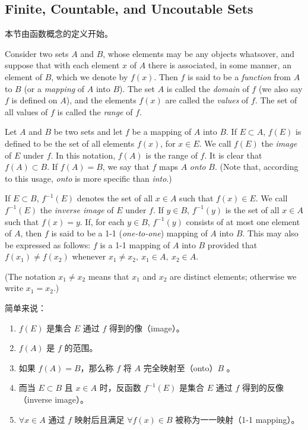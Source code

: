 \documentclass[../poma-notes.tex]{subfiles}
\begin{document}
\subsection*{Finite, Countable, and Uncoutable Sets}

本节由函数概念的定义开始。

\begin{definition}
  Consider two sets $A$ and $B$, whose elements may be any objects whatsover, and suppose that with each
  element $x$ of $A$ there is associated, in some manner, an element of $B$, which we denote by $f(x)$.
  Then $f$ is said to be a \textit{function} from $A$ to $B$ (or a \textit{mapping} of $A$ into $B$).
  The set $A$ is called the \textit{domain} of $f$ (we also say $f$ is defined on $A$), and the elements $f(x)$
  are called the \textit{values} of $f$. The set of all values of $f$ is called the \textit{range} of $f$.
\end{definition}

\begin{definition}
  Let $A$ and $B$ be two sets and let $f$ be a mapping of $A$ into $B$. If $E \subset A$, $f(E)$ is defined to
  be the set of all elements $f(x)$, for $x \in E$. We call $f(E)$ the \textit{image} of $E$ under $f$.
  In this notation, $f(A)$ is the range of $f$. It is clear that $f(A) \subset B$. If $f(A)=B$, we say that $f$
  maps $A$ \textit{onto} $B$. (Note that, according to this usage, \textit{onto} is more specific than \textit{into}.)

  If $E \subset B$, $f^{-1}(E)$ denotes the set of all $x \in A$ such that $f(x) \in E$. We call $f^{-1}(E)$ the
  \textit{inverse image} of $E$ under $f$. If $y \in B$, $f^{-1}(y)$ is the set of all $x \in A$ such that
  $f(x)=y$. If, for each $y \in B$, $f^{-1}(y)$ consists of at most one element of $A$, then $f$ is said to be
  a 1-1 (\textit{one-to-one}) mapping of $A$ into $B$. This may also be expressed as follows: $f$ is a 1-1 mapping
  of $A$ into $B$ provided that $f(x_1) \ne f(x_2)$ whenever $x_1 \ne x_2,\ x_1 \in A,\ x_2 \in A$.

  (The notation $x_1 \ne x_2$ means that $x_1$ and $x_2$ are distinct elements; otherwise we write $x_1=x_2$.)
\end{definition}

\begin{anote}
  简单来说：
  \begin{enumerate}
    \item $f(E)$ 是集合 $E$ 通过 $f$ 得到的像（image）。
    \item $f(A)$ 是 $f$ 的范围。
    \item 如果 $f(A)=B$，那么称 $f$ 将 $A$ 完全映射至（onto）$B$ 。
    \item 而当 $E \subset B$ 且 $x \in A$ 时，反函数 $f^{-1}(E)$ 是集合 $E$ 通过 $f$ 得到的反像（inverse image）。
    \item $\forall x \in A$ 通过 $f$ 映射后且满足 $\forall f(x) \in B$ 被称为一一映射（1-1 mapping）。
  \end{enumerate}
\end{anote}
\end{document}
